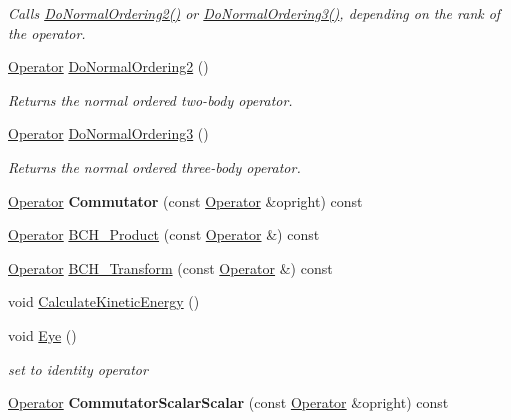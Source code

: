 \begin{DoxyCompactItemize}
\begin{DoxyCompactList}\small\item\em Calls \hyperlink{classOperator_a652d989590422a2b26e662625b07254e}{Do\-Normal\-Ordering2()} or \hyperlink{classOperator_a7fd029569796107c87ff17c5a7912480}{Do\-Normal\-Ordering3()}, depending on the rank of the operator. \end{DoxyCompactList}\item 
\hyperlink{classOperator}{Operator} \hyperlink{classOperator_a652d989590422a2b26e662625b07254e}{Do\-Normal\-Ordering2} ()
\begin{DoxyCompactList}\small\item\em Returns the normal ordered two-\/body operator. \end{DoxyCompactList}\item 
\hyperlink{classOperator}{Operator} \hyperlink{classOperator_a7fd029569796107c87ff17c5a7912480}{Do\-Normal\-Ordering3} ()
\begin{DoxyCompactList}\small\item\em Returns the normal ordered three-\/body operator. \end{DoxyCompactList}\item 
\hypertarget{classOperator_a23ccb8a0b3124e281b7f33e298c7d6de}{\hyperlink{classOperator}{Operator} {\bfseries Commutator} (const \hyperlink{classOperator}{Operator} \&opright) const }\label{classOperator_a23ccb8a0b3124e281b7f33e298c7d6de}

\item 
\hyperlink{classOperator}{Operator} \hyperlink{classOperator_a0db0f9c98175e3fd4634dc56544ce87b}{B\-C\-H\-\_\-\-Product} (const \hyperlink{classOperator}{Operator} \&) const 
\item 
\hyperlink{classOperator}{Operator} \hyperlink{classOperator_afdb54d55b3dc10baf795a59fd9129182}{B\-C\-H\-\_\-\-Transform} (const \hyperlink{classOperator}{Operator} \&) const 
\item 
void \hyperlink{classOperator_a701c64f8be794e89fd28a643b56d534a}{Calculate\-Kinetic\-Energy} ()
\item 
\hypertarget{classOperator_a03a378f0da2fe71d8160bd3262891457}{void \hyperlink{classOperator_a03a378f0da2fe71d8160bd3262891457}{Eye} ()}\label{classOperator_a03a378f0da2fe71d8160bd3262891457}

\begin{DoxyCompactList}\small\item\em set to identity operator \end{DoxyCompactList}\item 
\hypertarget{classOperator_a0b9bd2ad0883e61e959c06abf273faa0}{\hyperlink{classOperator}{Operator} {\bfseries Commutator\-Scalar\-Scalar} (const \hyperlink{classOperator}{Operator} \&opright) const }\label{classOperator_a0b9bd2ad0883e61e959c06abf273faa0}


\end{DoxyCompactItemize}
